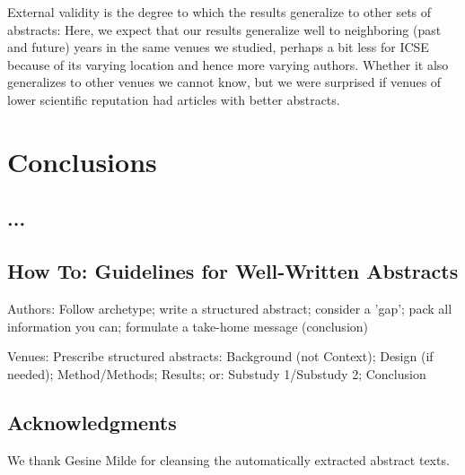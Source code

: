 \documentclass[10pt,journal,compsoc]{IEEEtran}
\newcommand{\ifarxiv}[1]{#1}  %
\begin{document}
External validity is the degree to which the results generalize
to other sets of abstracts:
Here, we expect that our results generalize well to
neighboring (past and future) years in the same venues
we studied, perhaps a bit less for ICSE because of its
varying location and hence more varying authors.
Whether it also generalizes to other venues
we cannot know, but we were surprised if venues of lower
scientific reputation had articles with better abstracts.


\section{Conclusions}


\subsection{...}
\noindent


\subsection{How To: Guidelines for Well-Written Abstracts}

\noindent
Authors: Follow archetype; write a structured abstract; consider a 'gap'; pack all information you can; formulate a take-home message (conclusion)

Venues: Prescribe structured abstracts: Background (not Context); Design (if needed); Method/Methods; Results; or: Substudy 1/Substudy 2; Conclusion





\subsection*{Acknowledgments}
\noindent We thank Gesine Milde for cleansing the automatically extracted abstract texts.






\ifarxiv{}
\end{document}
